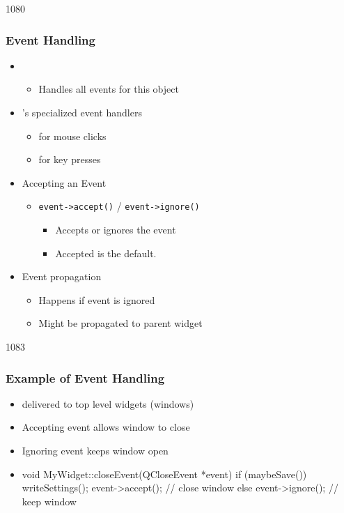 \begin{slide}{1080}
\frametitle{Event Handling}

\begin{itemize}
\item {}
  \begin{itemize}
  \item Handles all events for this object
 \end{itemize}
\item {}'s specialized event handlers
  \begin{itemize}
  \item {} for mouse clicks
  \item {} for key presses
 \end{itemize}
\item Accepting an Event
  \begin{itemize}
  \item \lstinline{event->accept()} / \lstinline{event->ignore()}
    \begin{itemize}
    \item Accepts or ignores the event
    \item Accepted is the default.
    \end{itemize}
  \end{itemize}
\item Event propagation
  \begin{itemize}
  \item Happens if event is ignored
  \item Might be propagated to parent widget
  \end{itemize}
\end{itemize}
\end{slide}

\begin{slide}[fragile]{1083}
\frametitle{Example of Event Handling}

\begin{itemize}
\item {} delivered to top level widgets (windows)
\item Accepting event allows window to close
\item Ignoring event keeps window open
\item[]
\begin{cpp}
void MyWidget::closeEvent(QCloseEvent *event) {
  if (maybeSave()) {
    writeSettings();
    event->accept(); // close window
  } else {
    event->ignore(); // keep window
  }
}
\end{cpp}  
\end{itemize}

\end{slide}

